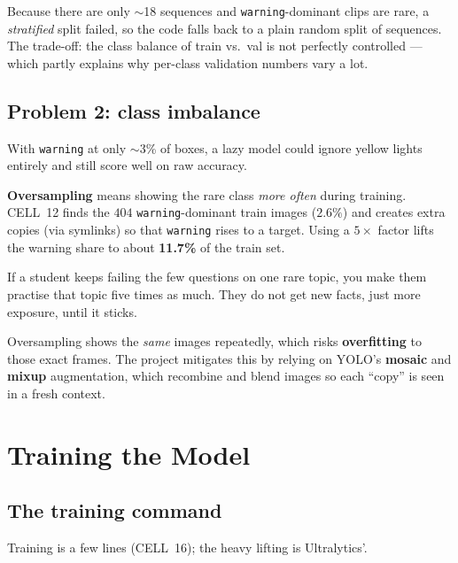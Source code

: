 \begin{warningbox}
Because there are only $\sim$18 sequences and \texttt{warning}-dominant
clips are rare, a \emph{stratified} split failed, so the code falls back
to a plain random split of sequences. The trade-off: the class balance of
train vs.\ val is not perfectly controlled --- which partly explains why
per-class validation numbers vary a lot.
\end{warningbox}

\section{Problem 2: class imbalance}
With \texttt{warning} at only $\sim$3\% of boxes, a lazy model could
ignore yellow lights entirely and still score well on raw accuracy.

\begin{keyconcept}[: oversampling]
\textbf{Oversampling} means showing the rare class \emph{more often}
during training. CELL~12 finds the $404$ \texttt{warning}-dominant train
images ($2.6\%$) and creates extra copies (via symlinks) so that
\texttt{warning} rises to a target. Using a $5\times$ factor lifts the
warning share to about \textbf{11.7\%} of the train set.
\end{keyconcept}

\begin{analogy}
If a student keeps failing the few questions on one rare topic, you make
them practise that topic five times as much. They do not get new facts,
just more exposure, until it sticks.
\end{analogy}

\begin{warningbox}
Oversampling shows the \emph{same} images repeatedly, which risks
\textbf{overfitting} to those exact frames. The project mitigates this by
relying on YOLO's \textbf{mosaic} and \textbf{mixup} augmentation, which
recombine and blend images so each ``copy'' is seen in a fresh context.
\end{warningbox}

\chapter{Training the Model}
\label{ch:train}

\section{The training command}
Training is a few lines (CELL~16); the heavy lifting is Ultralytics'.

